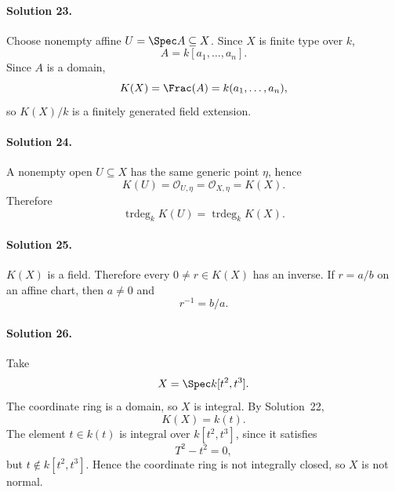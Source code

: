 \paragraph{Solution 23.}
Choose nonempty affine \(U=\Spec A\subseteq X\). Since \(X\) is finite type over \(k\),
\[
A=k[a_1,\ldots,a_n].
\]
Since \(A\) is a domain,
\[
K(X)=\Frac(A)=k(a_1,\ldots,a_n),
\]
so \(K(X)/k\) is a finitely generated field extension.

\paragraph{Solution 24.}
A nonempty open \(U\subseteq X\) has the same generic point \(\eta\), hence
\[
K(U)=\mathcal O_{U,\eta}=\mathcal O_{X,\eta}=K(X).
\]
Therefore
\[
\operatorname{trdeg}_kK(U)=\operatorname{trdeg}_kK(X).
\]

\paragraph{Solution 25.}
\(K(X)\) is a field. Therefore every \(0\ne r\in K(X)\) has an inverse. If \(r=a/b\) on an
affine chart, then \(a\ne0\) and
\[
r^{-1}=b/a.
\]

\paragraph{Solution 26.}
Take
\[
X=\Spec k[t^2,t^3].
\]
The coordinate ring is a domain, so \(X\) is integral. By Solution~22,
\[
K(X)=k(t).
\]
The element \(t\in k(t)\) is integral over \(k[t^2,t^3]\), since it satisfies
\[
T^2-t^2=0,
\]
but \(t\notin k[t^2,t^3]\). Hence the coordinate ring is not integrally closed, so \(X\) is not
normal.
